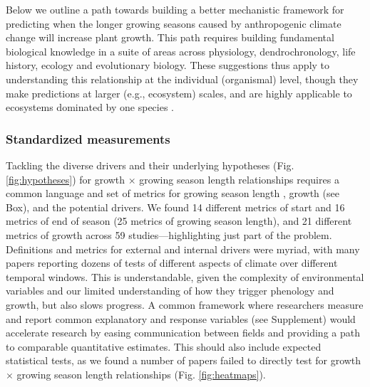 \documentclass[11pt]{article}
\begin{document}

Below we outline a path towards building a better mechanistic framework for predicting when the longer growing seasons caused by anthropogenic climate change will increase plant growth. This path requires building fundamental biological knowledge in a suite of areas across physiology, dendrochronology, life history, ecology and evolutionary biology. These suggestions thus apply to understanding this relationship at the individual (organismal) level, though they make predictions at larger (e.g., ecosystem) scales, and are highly applicable to ecosystems dominated by one species \citep[e.g.,][]{chen1999effects}. %

\subsubsection*{Standardized measurements} %

Tackling the diverse drivers and their underlying hypotheses (Fig. \ref{fig:hypotheses}) for growth $\times$ growing season length relationships requires a common language and set of metrics for growing season length \citep{korner2023four}, growth (see Box), and the potential drivers. We found 14 different metrics of start and 16 metrics of end of season (25 metrics of growing season length), and 21 different metrics of growth across 59 studies---highlighting just part of the problem. Definitions and metrics for external and internal drivers were myriad, %
with many papers reporting dozens of tests of different aspects of climate over different temporal windows. This is understandable, given the complexity of environmental variables and our limited understanding of how they trigger phenology and growth, but also slows progress. A common framework where researchers measure and report common explanatory and response variables (see Supplement) would accelerate research by easing communication between fields and providing a path to comparable quantitative estimates. This should also include expected statistical tests, as we found a number of papers failed to directly test for growth $\times$ growing season length relationships (Fig. \ref{fig:heatmaps}). %
\end{document}
